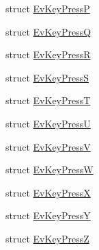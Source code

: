 \begin{DoxyCompactItemize}
struct \hyperlink{structcl__keyboard_1_1EvKeyPressP}{Ev\+Key\+PressP}
\item 
struct \hyperlink{structcl__keyboard_1_1EvKeyPressQ}{Ev\+Key\+PressQ}
\item 
struct \hyperlink{structcl__keyboard_1_1EvKeyPressR}{Ev\+Key\+PressR}
\item 
struct \hyperlink{structcl__keyboard_1_1EvKeyPressS}{Ev\+Key\+PressS}
\item 
struct \hyperlink{structcl__keyboard_1_1EvKeyPressT}{Ev\+Key\+PressT}
\item 
struct \hyperlink{structcl__keyboard_1_1EvKeyPressU}{Ev\+Key\+PressU}
\item 
struct \hyperlink{structcl__keyboard_1_1EvKeyPressV}{Ev\+Key\+PressV}
\item 
struct \hyperlink{structcl__keyboard_1_1EvKeyPressW}{Ev\+Key\+PressW}
\item 
struct \hyperlink{structcl__keyboard_1_1EvKeyPressX}{Ev\+Key\+PressX}
\item 
struct \hyperlink{structcl__keyboard_1_1EvKeyPressY}{Ev\+Key\+PressY}
\item 
struct \hyperlink{structcl__keyboard_1_1EvKeyPressZ}{Ev\+Key\+PressZ}
\end{DoxyCompactItemize}
